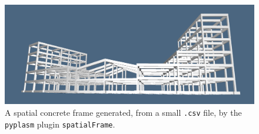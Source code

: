 \begin{figure}[t] %
   \centering
%   
   \includegraphics[width=\linewidth]{images/frame}
      \caption{A spatial concrete frame generated, from a small \texttt{.csv} file, by the \texttt{pyplasm} plugin \texttt{spatialFrame}.}
   \label{spatialFrame}
\end{figure}

